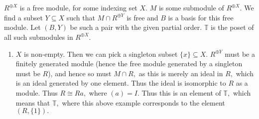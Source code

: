 \documentclass{article}
\begin{document}
\section{} %
$R^{\oplus X}$ is a free module, for some indexing set $X.$ $M$ is some submodule of $R^{\oplus X}.$ We find a subset $Y \subseteq X$ such that $M \cap 
R^{\oplus Y}$ is free and $B$ is a basis for this free module. Let $(B,Y)$ be such a pair with the given partial order. $\mathbb{T}$ is the poset of all 
such submodules in $R^{\oplus X}.$
\begin{enumerate}
	\item $X$ is non-empty. Then we can pick a singleton subset $ \{x\} \subseteq X.$ $R^{\oplus Y}$ must be a finitely generated module (hence the free 
	module generated by a singleton must be $R$), and hence so must $M \cap R,$ as this is merely an ideal in $R,$ which is an ideal generated by one 
	element. Thus the ideal is isomorphic to $R$ as a module. Thus $R \cong Ra,$ where $(a)=I.$ Thus this is an element of $\mathbb{T},$ which means that 
	$\mathbb{T},$ where this above example corresponds to the element $(R,\{1\}).$ 
\end{enumerate}
\end{document}
